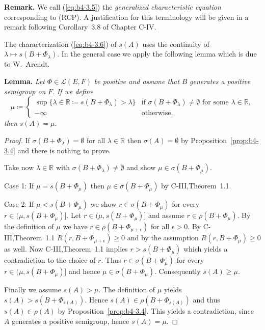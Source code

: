 \medskip\noindent
\textbf{Remark.}
	We call (\ref{eq:b4-3.5}) the \emph{generalized characteristic equation} corresponding to (RCP). 
	A justification for this terminology will be given in a remark following Corollary~3.8 of Chapter C-IV.

The characterization (\ref{eq:b4-3.6}) of $s(A)$ uses the continuity of $\lambda \mapsto s(B + \Phi_{\lambda})$. 
In the general case we apply the following lemma which is due to W.\ Arendt.

\medskip\noindent
\textbf{Lemma.} 
	\textit{Let } $\Phi \in \mathcal{L}(E,F)$ \textit{ be positive and assume that } $B$ \textit{ generates a positive semigroup on } $F$. 
	\textit{ If we define}
	\[
	\mu \coloneq 
	\begin{cases}
		\sup\{\lambda \in \mathbb{R} \coloneq s(B+\Phi_{\lambda}) > \lambda\} & \text{if } \sigma(B+\Phi_{\lambda}) \neq \emptyset \text{ for some } \lambda \in \mathbb{R}, \\
		-\infty & \text{otherwise},
	\end{cases}
	\]
	\textit{then } $s(A) = \mu$.
	

\begin{proof}
	If $\sigma(B+\Phi_{\lambda}) = \emptyset$ for all $\lambda \in \mathbb{R}$ then $\sigma(A) = \emptyset$ by Proposition~\ref{prop:b4-3.4} and there is nothing to prove.
	
	Take now $\lambda \in \mathbb{R}$ with $\sigma(B+\Phi_{\lambda}) \neq \emptyset$ and show $\mu \in \sigma(B+\Phi_{\mu})$.
	
	Case 1: If $\mu = s(B+\Phi_{\mu})$ then $\mu \in \sigma(B+\Phi_{\mu})$ by C-III,Theorem~1.1.
	
	Case 2: If $\mu < s(B+\Phi_{\mu})$ we show $r \in \sigma(B+\Phi_{\mu})$ for every $r \in (\mu,s(B+\Phi_{\mu})]$.
%
%
%
%
%
\newpage
%
Let $r \in (\mu,s(B+\Phi_{\mu})]$ and assume $r \in \rho(B+\Phi_{\mu})$. 
By the definition of $\mu$ we have $r \in \rho(B+\Phi_{\mu+\epsilon})$ for all $\epsilon > 0$. 
By C-III,Theorem~1.1 $R(r,B+\Phi_{\mu+\epsilon}) \geq 0$ and by the assumption $R(r,B+\Phi_{\mu}) \geq 0$ as well. 
Now C-III,Theorem~1.1 implies $r > s(B+\Phi_{\mu})$ which yields a contradiction to the choice of $r$. 
Thus $r \in \sigma(B+\Phi_{\mu})$ for every $r \in (\mu,s(B+\Phi_{\mu})]$ and hence $\mu \in \sigma(B+\Phi_{\mu})$. 
Consequently $s(A) \geq \mu$.

Finally we assume $s(A) > \mu$. 
The definition of $\mu$ yields $s(A) > s(B+\Phi_{s(A)})$. 
Hence $s(A) \in \rho(B+\Phi_{s(A)})$ and thus $s(A) \in \rho(A)$ by Proposition~\ref{prop:b4-3.4}. 
This yields a contradiction, since $A$ generates a positive semigroup, hence $s(A) = \mu$.
\end{proof}

